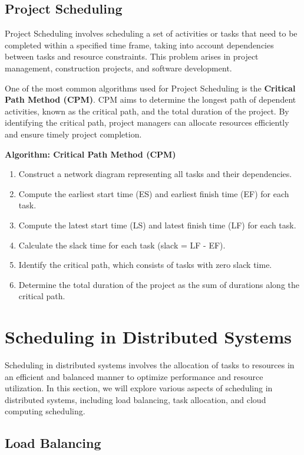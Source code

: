 \documentclass[12pt]{book} %
\begin{document}
\subsection{Project Scheduling}
Project Scheduling involves scheduling a set of activities or tasks that need to be completed within a specified time frame, taking into account dependencies between tasks and resource constraints. This problem arises in project management, construction projects, and software development.

One of the most common algorithms used for Project Scheduling is the \textbf{Critical Path Method (CPM)}. CPM aims to determine the longest path of dependent activities, known as the critical path, and the total duration of the project. By identifying the critical path, project managers can allocate resources efficiently and ensure timely project completion.

\textbf{Algorithm: Critical Path Method (CPM)}
\begin{enumerate}
    \item Construct a network diagram representing all tasks and their dependencies.
    \item Compute the earliest start time (ES) and earliest finish time (EF) for each task.
    \item Compute the latest start time (LS) and latest finish time (LF) for each task.
    \item Calculate the slack time for each task (slack = LF - EF).
    \item Identify the critical path, which consists of tasks with zero slack time.
    \item Determine the total duration of the project as the sum of durations along the critical path.
\end{enumerate}

\section{Scheduling in Distributed Systems}

Scheduling in distributed systems involves the allocation of tasks to resources in an efficient and balanced manner to optimize performance and resource utilization. In this section, we will explore various aspects of scheduling in distributed systems, including load balancing, task allocation, and cloud computing scheduling.

\subsection{Load Balancing}
\end{document}
